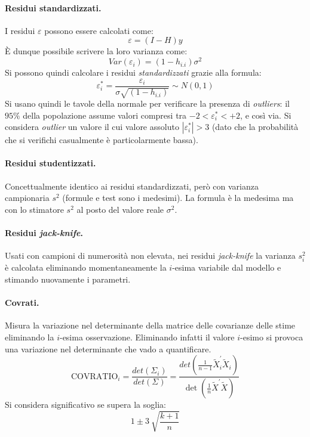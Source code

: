 \documentclass[a4page, 11pt]{article} %
\begin{document}
\paragraph{Residui standardizzati.} I residui $\varepsilon$ possono essere calcolati come:
\begin{equation*}
\varepsilon = (I-H)y
\end{equation*}
È dunque possibile scrivere la loro varianza come:
\begin{equation*}
Var(\varepsilon_i) = (1 - h_{i.i})\sigma^2
\end{equation*}
Si possono quindi calcolare i residui \textit{standardizzati} grazie alla formula:
\begin{equation*}
\varepsilon_i^* = \frac{\varepsilon_i}{\sigma \sqrt{(1-h_{i.i})}} \sim N(0, 1)
\end{equation*}
Si usano quindi le tavole della normale per verificare la presenza di \textit{outliers}: il $95\%$ della popolazione assume valori compresi tra $-2 < \varepsilon_i^* < +2$, e così via.
Si considera \textit{outlier} un valore il cui valore assoluto $|\varepsilon_i^*| > 3$ (dato che la probabilità che si verifichi casualmente è particolarmente bassa).

\paragraph{Residui studentizzati.} Concettualmente identico ai residui standardizzati, però con varianza campionaria $s^2$ (formule e test sono i medesimi).
La formula è la medesima ma con lo stimatore $s^2$ al posto del valore reale $\sigma^2$.

\paragraph{Residui \textit{jack-knife}.} Usati con campioni di numerosità non elevata, nei residui \textit{jack-knife} la varianza $s^2_i$ è calcolata eliminando momentaneamente la $i$-esima variabile dal modello e stimando nuovamente i parametri.

\paragraph{Covrati.} Misura la variazione nel determinante della matrice delle covarianze delle stime eliminando la $i$-esima osservazione.
Eliminando infatti il valore $i$-esimo si provoca una variazione nel determinante che vado a quantificare.
\begin{equation*}
\text{COVRATIO}_i = \frac{det(\Sigma_i)}{det(\Sigma)} = \frac{det(\frac{1}{n - 1}\tilde{X}^{\prime}_i\tilde{X}_i)}{\det(\frac{1}{n}\tilde{X}^{\prime}\tilde{X})}
\end{equation*}
Si considera significativo se supera la soglia:
\begin{equation*}
1 \pm 3 \  \sqrt{\frac{k + 1}{n}}
\end{equation*}
\end{document}

